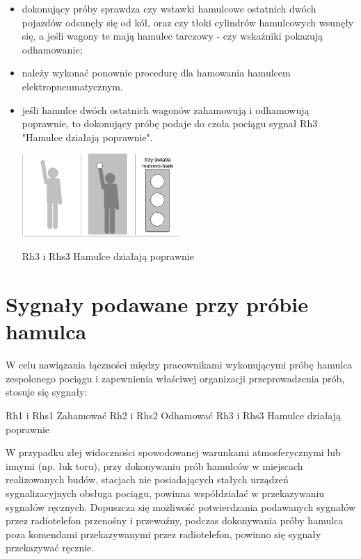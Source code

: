 \begin{itemize}
	\item dokonujący próby sprawdza czy wstawki hamulcowe ostatnich dwóch pojazdów odsunęły się od kół, oraz czy tłoki cylindrów hamulcowych wsunęły się, a jeśli wagony te mają hamulec tarczowy - czy wskaźniki pokazują odhamowanie; 
	\item należy wykonać ponownie procedurę dla hamowania hamulcem elektropneumatycznym.
	\item jeśli hamulce dwóch ostatnich wagonów zahamowują i odhamowują poprawnie, to dokonujący próbę podaje do czoła pociągu sygnał Rh3 "Hamulce działają poprawnie".
	
\begin{marginfigure}
		\includegraphics[width=6cm]{skryptkierownik-img/skryptkierownik-img068.png}
		\caption{Rh3 i Rhs3 Hamulce działają poprawnie}
\end{marginfigure}

\end{itemize}

\section{Sygnały podawane przy próbie hamulca}

W celu nawiązania łączności między pracownikami wykonującymi próbę hamulca zespolonego pociągu i zapewnienia właściwej organizacji przeprowadzenia prób, stosuje się sygnały:

Rh1 i Rhs1 Zahamować
Rh2 i Rhs2 Odhamować
Rh3 i Rhs3 Hamulce działają poprawnie

W przypadku złej widoczności spowodowanej warunkami atmosferycznymi lub innymi (np. łuk toru), przy dokonywaniu prób hamulców w miejscach realizowanych budów, stacjach nie posiadających stałych urządzeń sygnalizacyjnych obsługa pociągu, powinna współdziałać w przekazywaniu sygnałów ręcznych. Dopuszcza się możliwość potwierdzania podawanych sygnałów przez radiotelefon przenośny i przewoźny, podczas dokonywania próby hamulca poza komendami przekazywanymi przez radiotelefon, powinno się sygnały przekazywać ręcznie.

